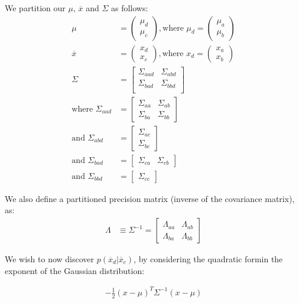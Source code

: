 We partition our $\mu$, $\overline{x}$ and $\Sigma$ as follows:
\begin{align}
	\mu &= \begin{pmatrix}
		\mu_d \\
		\mu_c
	\end{pmatrix}, \text{where } \mu_d = \begin{pmatrix}\mu_a \\ \mu_b \end{pmatrix} \\
	\overline{x} &= \begin{pmatrix}
		x_d \\
		x_c
	\end{pmatrix}, \text{where } x_d = \begin{pmatrix}x_a \\ x_b \end{pmatrix} \\
	\Sigma &= \begin{bmatrix}
		\Sigma_{aad} & \Sigma_{abd} \\
		\Sigma_{bad} & \Sigma_{bbd} \\
	\end{bmatrix} \\
	\text{where } \Sigma_{aad} &= \begin{bmatrix}
		\Sigma_{aa} & \Sigma_{ab} \\
		\Sigma_{ba} & \Sigma_{bb}
	\end{bmatrix} \\
	\text{and } \Sigma_{abd} &= \begin{bmatrix}
		\Sigma_{ac} \\ \Sigma_{bc}
	\end{bmatrix} \\
	\text{and } \Sigma_{bad} &= \begin{bmatrix}
		\Sigma_{ca} & \Sigma_{cb} 
	\end{bmatrix} \\
	\text{and } \Sigma_{bbd} &= \begin{bmatrix} \Sigma_{cc} \end{bmatrix}
\end{align}

We also define a partitioned precision matrix 
(inverse of the covariance matrix), as:
\begin{align}
	\Lambda &\equiv \Sigma^{-1} = \begin{bmatrix}
		\Lambda_{aa} & \Lambda_{ab} \\
		\Lambda_{ba} & \Lambda_{bb}		
	\end{bmatrix}
\end{align}

We wish to now discover $p(\overline{x}_d | \overline{x}_c)$, by considering
the quadratic formin the exponent of the Gaussian distribution:

\begin{align}
	-\frac{1}{2} (x - \mu)^T \Sigma^{-1}(x - \mu)
\end{align}
